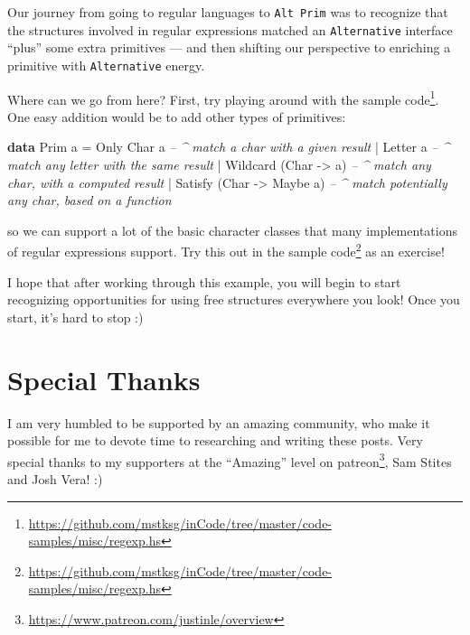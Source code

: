\documentclass[]{article}
\newenvironment{Shaded}{}{}
\newcommand{\CommentTok}[1]{\textcolor[rgb]{0.38,0.63,0.69}{\textit{#1}}}
\newcommand{\DataTypeTok}[1]{\textcolor[rgb]{0.56,0.13,0.00}{#1}}
\newcommand{\FunctionTok}[1]{\textcolor[rgb]{0.02,0.16,0.49}{#1}}
\newcommand{\KeywordTok}[1]{\textcolor[rgb]{0.00,0.44,0.13}{\textbf{#1}}}
\newcommand{\NormalTok}[1]{#1}
\newcommand{\OtherTok}[1]{\textcolor[rgb]{0.00,0.44,0.13}{#1}}
\renewcommand{\href}[2]{#2\footnote{\url{#1}}}
\begin{document}
Our journey from going to regular languages to \texttt{Alt\ Prim} was to
recognize that the structures involved in regular expressions matched an
\texttt{Alternative} interface ``plus'' some extra primitives --- and then
shifting our perspective to enriching a primitive with \texttt{Alternative}
energy.

Where can we go from here? First, try playing around with the
\href{https://github.com/mstksg/inCode/tree/master/code-samples/misc/regexp.hs}{sample
code}. One easy addition would be to add other types of primitives:

\begin{Shaded}
\begin{Highlighting}[]
\KeywordTok{data} \DataTypeTok{Prim}\NormalTok{ a }\FunctionTok{=}
    \DataTypeTok{Only} \DataTypeTok{Char}\NormalTok{ a                 }\CommentTok{-- ^ match a char with a given result}
  \FunctionTok{|} \DataTypeTok{Letter}\NormalTok{ a                    }\CommentTok{-- ^ match any letter with the same result}
  \FunctionTok{|} \DataTypeTok{Wildcard}\NormalTok{ (}\DataTypeTok{Char} \OtherTok{->}\NormalTok{ a)        }\CommentTok{-- ^ match any char, with a computed result}
  \FunctionTok{|} \DataTypeTok{Satisfy}\NormalTok{ (}\DataTypeTok{Char} \OtherTok{->} \DataTypeTok{Maybe}\NormalTok{ a)   }\CommentTok{-- ^ match potentially any char, based on a function}
\end{Highlighting}
\end{Shaded}

so we can support a lot of the basic character classes that many implementations
of regular expressions support. Try this out in the
\href{https://github.com/mstksg/inCode/tree/master/code-samples/misc/regexp.hs}{sample
code} as an exercise!

I hope that after working through this example, you will begin to start
recognizing opportunities for using free structures everywhere you look! Once
you start, it's hard to stop :)

\hypertarget{special-thanks}{%
\section{Special Thanks}\label{special-thanks}}

I am very humbled to be supported by an amazing community, who make it possible
for me to devote time to researching and writing these posts. Very special
thanks to my supporters at the ``Amazing'' level on
\href{https://www.patreon.com/justinle/overview}{patreon}, Sam Stites and Josh
Vera! :)
\end{document}
